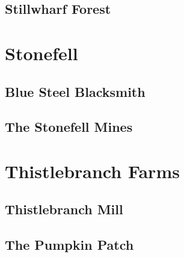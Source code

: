 \subsection{Stillwharf Forest}

\section{Stonefell}

\subsection{Blue Steel Blacksmith}

\subsection{The Stonefell Mines}

\section{Thistlebranch Farms}

\subsection{Thistlebranch Mill}

\subsection{The Pumpkin Patch}